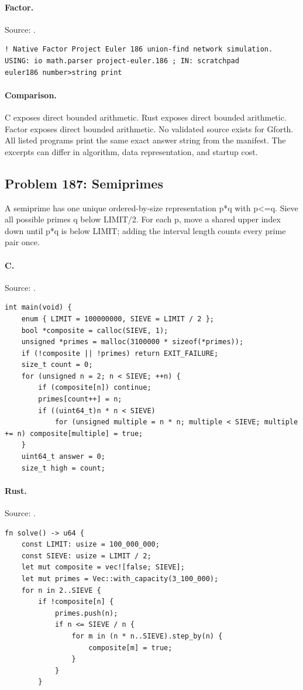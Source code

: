 \paragraph{Factor.} Source: .
\begin{lstlisting}
! Native Factor Project Euler 186 union-find network simulation.
USING: io math.parser project-euler.186 ; IN: scratchpad
euler186 number>string print
\end{lstlisting}

\paragraph{Comparison.}
C exposes direct bounded arithmetic. Rust exposes direct bounded arithmetic. Factor exposes direct bounded arithmetic.
No validated source exists for Gforth.
All listed programs print the same exact answer string from the manifest. The excerpts can differ in algorithm, data representation, and startup cost.

\subsection{Problem 187: Semiprimes}
\label{walkthrough:p187}
A semiprime has one unique ordered-by-size representation p*q with p<=q. Sieve all possible primes q below LIMIT/2. For each p, move a shared upper index down until p*q is below LIMIT; adding the interval length counts every prime pair once.

\paragraph{C.} Source: .
\begin{lstlisting}
int main(void) {
    enum { LIMIT = 100000000, SIEVE = LIMIT / 2 };
    bool *composite = calloc(SIEVE, 1);
    unsigned *primes = malloc(3100000 * sizeof(*primes));
    if (!composite || !primes) return EXIT_FAILURE;
    size_t count = 0;
    for (unsigned n = 2; n < SIEVE; ++n) {
        if (composite[n]) continue;
        primes[count++] = n;
        if ((uint64_t)n * n < SIEVE)
            for (unsigned multiple = n * n; multiple < SIEVE; multiple += n) composite[multiple] = true;
    }
    uint64_t answer = 0;
    size_t high = count;
\end{lstlisting}

\paragraph{Rust.} Source: .
\begin{lstlisting}
fn solve() -> u64 {
    const LIMIT: usize = 100_000_000;
    const SIEVE: usize = LIMIT / 2;
    let mut composite = vec![false; SIEVE];
    let mut primes = Vec::with_capacity(3_100_000);
    for n in 2..SIEVE {
        if !composite[n] {
            primes.push(n);
            if n <= SIEVE / n {
                for m in (n * n..SIEVE).step_by(n) {
                    composite[m] = true;
                }
            }
        }
\end{lstlisting}

